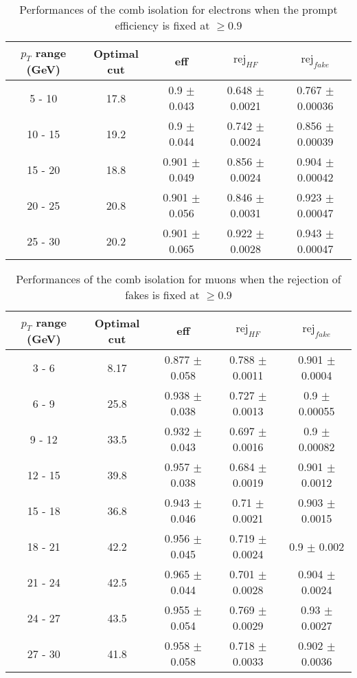 \begin{table}[htbp]
   \centering
   \begin{tabular}{|c|c|c|c|c|}
      \hline
      $p_T$ range (GeV) & Optimal cut & eff & $\textrm{rej}_{HF}$ & $\textrm{rej}_{fake}$ \\
      \hline
      5 - 10 & 17.8 & 0.9 $\pm$ 0.043 & 0.648 $\pm$ 0.0021 & 0.767 $\pm$ 0.00036 \\
      \hline
      10 - 15 & 19.2 & 0.9 $\pm$ 0.044 & 0.742 $\pm$ 0.0024 & 0.856 $\pm$ 0.00039 \\
      \hline
      15 - 20 & 18.8 & 0.901 $\pm$ 0.049 & 0.856 $\pm$ 0.0024 & 0.904 $\pm$ 0.00042 \\
      \hline
      20 - 25 & 20.8 & 0.901 $\pm$ 0.056 & 0.846 $\pm$ 0.0031 & 0.923 $\pm$ 0.00047 \\
      \hline
      25 - 30 & 20.2 & 0.901 $\pm$ 0.065 & 0.922 $\pm$ 0.0028 & 0.943 $\pm$ 0.00047 \\
      \hline
   \end{tabular}
   \caption{\small{Performances of the comb isolation for electrons when the prompt efficiency is fixed at $\geq 0.9$}\label{tab:comb_elec_eff}}
\end{table}






\begin{table}[htbp]
   \centering
   \begin{tabular}{|c|c|c|c|c|}
      \hline
      $p_T$ range (GeV) & Optimal cut & eff & $\textrm{rej}_{HF}$ & $\textrm{rej}_{fake}$ \\
      \hline
      3 - 6 & 8.17 & 0.877 $\pm$ 0.058 & 0.788 $\pm$ 0.0011 & 0.901 $\pm$ 0.0004 \\
      \hline
      6 - 9 & 25.8 & 0.938 $\pm$ 0.038 & 0.727 $\pm$ 0.0013 & 0.9 $\pm$ 0.00055 \\
      \hline
      9 - 12 & 33.5 & 0.932 $\pm$ 0.043 & 0.697 $\pm$ 0.0016 & 0.9 $\pm$ 0.00082 \\
      \hline
      12 - 15 & 39.8 & 0.957 $\pm$ 0.038 & 0.684 $\pm$ 0.0019 & 0.901 $\pm$ 0.0012 \\
      \hline
      15 - 18 & 36.8 & 0.943 $\pm$ 0.046 & 0.71 $\pm$ 0.0021 & 0.903 $\pm$ 0.0015 \\
      \hline
      18 - 21 & 42.2 & 0.956 $\pm$ 0.045 & 0.719 $\pm$ 0.0024 & 0.9 $\pm$ 0.002 \\
      \hline
      21 - 24 & 42.5 & 0.965 $\pm$ 0.044 & 0.701 $\pm$ 0.0028 & 0.904 $\pm$ 0.0024 \\
      \hline
      24 - 27 & 43.5 & 0.955 $\pm$ 0.054 & 0.769 $\pm$ 0.0029 & 0.93 $\pm$ 0.0027 \\
      \hline
      27 - 30 & 41.8 & 0.958 $\pm$ 0.058 & 0.718 $\pm$ 0.0033 & 0.902 $\pm$ 0.0036 \\
      \hline
   \end{tabular}
   \caption{\small{Performances of the comb isolation for muons when the rejection of fakes is fixed at $\geq 0.9$}\label{tab:comb_muon_pureFake}}
\end{table}






